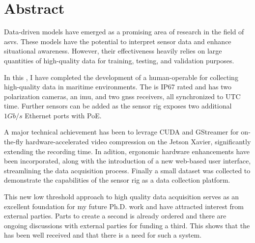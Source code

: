 \chapter*{Abstract}

Data-driven models have emerged as a promising area of research in the field of \glspl{asv}.
These models have the potential to interpret sensor data and enhance situational awareness.
However, their effectiveness heavily relies on large quantities of high-quality data for training, testing, and validation purposes.

In this \master, I have completed the development of a human-operable \sr for collecting high-quality data in maritime environments.
The \sr is IP67 rated and has two polarization cameras, an \gls{imu}, and two \gls{gnss} receivers, all synchronized to UTC time.
Further sensors can be added as the sensor rig exposes two additional $1Gb/s$ Ethernet ports with PoE.

A major technical achievement has been to levrage CUDA and GStreamer for on-the-fly hardware-accelerated video compression on the Jetson Xavier, significantly extending the recording time.
In adition, ergonomic hardware enhancements have been incorporated, along with the introduction of a new web-based user interface, streamlining the data acquisition process.
Finally a small dataset was collected to demonstrate the capabilities of the sensor rig as a data collection platform.

This new low threshold approach to high quality data acquisition serves as an excellent foundation for my future Ph.D. work and have attracted interest from external parties.
Parts to create a second \sr is already ordered and there are ongoing discussions with external parties for funding a third.
This shows that the \sr has been well received and that there is a need for such a system.

